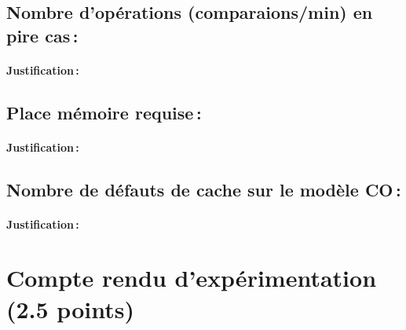 \documentclass[a4paper,10pt,french]{article}
\begin{document}

  \subsection{Nombre  d'opérations (comparaions/min)  en pire cas\,: }
    \paragraph{Justification\,: }
  \subsection{Place mémoire requise\,: }
    \paragraph{Justification\,: }

  \subsection{Nombre de défauts de cache sur le modèle CO\,:}
    \paragraph{Justification\,: }


\section{Compte rendu d'expérimentation (2.5 points)}
\end{document}

